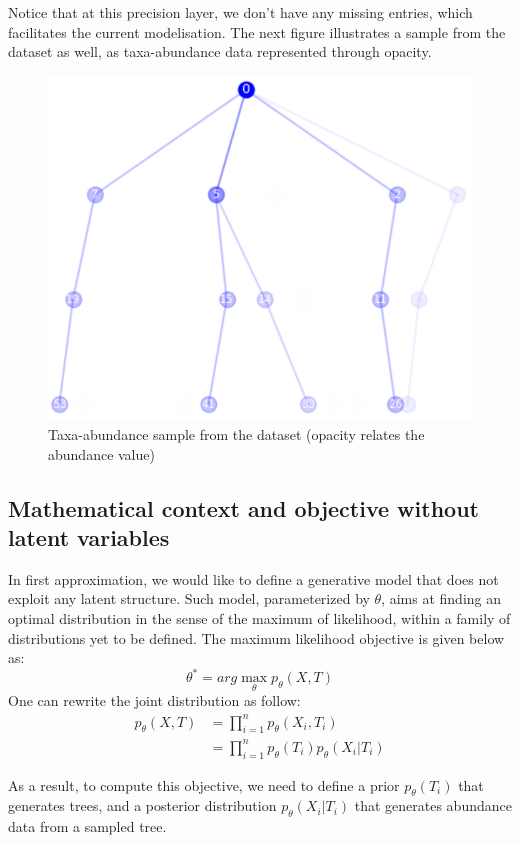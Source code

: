 Notice that at this precision layer, we don't have any missing entries, which facilitates the current modelisation.
The next figure illustrates a sample from the dataset as well, as taxa-abundance data represented through opacity.
\begin{figure}[H]
    \centering
    \includegraphics[scale=.6]{images/sample_taxaabundance_microbiota}
    \caption{Taxa-abundance sample from the dataset (opacity relates the abundance value)}
    \label{fig:taxa_abundance_sample_p4}
\end{figure}

\subsection{Mathematical context and objective without latent variables}

In first approximation, we would like to define a generative model that does not exploit any latent structure.
Such model, parameterized by $\theta$, aims at finding an optimal distribution in the sense of the maximum of likelihood,
within a family of distributions yet to be defined.
The maximum likelihood objective is given below as:
$$
\theta^* = arg\max_{\theta} p_{\theta}(X, T)
$$
One can rewrite the joint distribution as follow:
$$
\begin{align}
    p_{\theta}(X, T) &= \prod_{i=1}^n p_{\theta}(X_i, T_i) \\
    &= \prod_{i=1}^n p_{\theta}(T_i) p_{\theta}(X_i | T_i)
\end{align}
$$

As a result, to compute this objective, we need to define a prior $p_{\theta}(T_i)$ that generates trees,
and a posterior distribution $p_{\theta}(X_i | T_i)$ that generates abundance data from a sampled tree. \\

